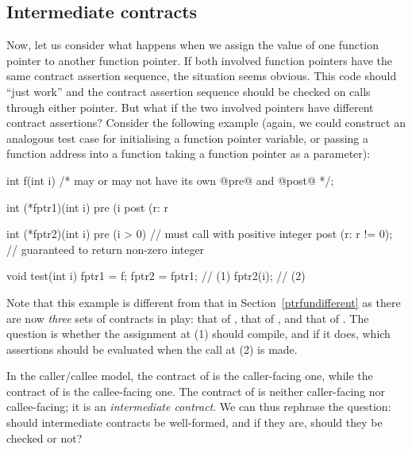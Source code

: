 \subsection{Intermediate contracts}
\label{intermediate}

Now, let us consider what happens when we assign the value of one function pointer to another function pointer. If both involved function pointers have the same contract assertion sequence, the situation seems obvious. This code should ``just work'' and the contract assertion sequence should be checked on calls through either pointer. But what if the two involved pointers have different contract assertions? Consider the following example (again, we could construct an analogous test case for initialising a function pointer variable, or passing a function address into a function taking a function pointer as a parameter):
\begin{codeblock}
int f(int i) /* may or may not have its own @pre@ and @post@ */;

int (*fptr1)(int i)
  pre (i %
  post (r: r %

int (*fptr2)(int i)
  pre (i > 0)           // must call with positive integer
  post (r: r != 0);     // guaranteed to return non-zero integer

void test(int i) {
  fptr1 = f;
  fptr2 = fptr1;  // (1)
  fptr2(i);       // (2)
}
\end{codeblock}
Note that this example is different from that in Section~\ref{ptrfundifferent} as there are now \emph{three} sets of contracts in play: that of , that of , and that of . The question is whether the assignment at (1) should compile, and if it does, which assertions should be evaluated when the call at (2) is made. 

In the caller/callee model, the contract of  is the caller-facing one, while the contract  of  is the callee-facing one. The contract of  is neither caller-facing nor callee-facing; it is an \emph{intermediate contract}. We can thus rephrase the question: should intermediate contracts be well-formed, and if they are, should they be checked or not?

